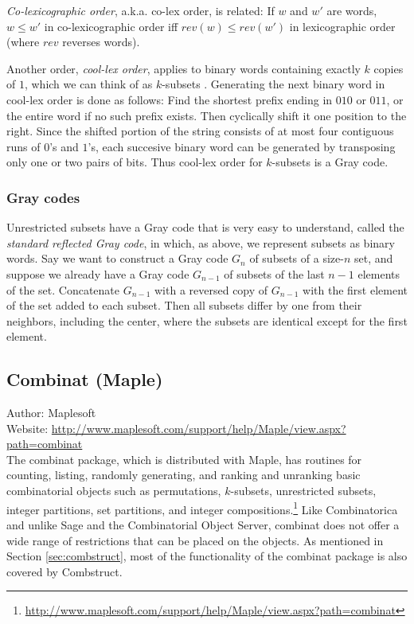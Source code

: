 \documentclass[12pt]{article}
\theoremstyle{plain}
\begin{document}
\emph{Co-lexicographic order}, a.k.a. co-lex order, is related: If \(w\) and \(w'\) are words, \(w \leq w'\) in co-lexicographic order iff \(rev(w) \leq rev(w')\) in lexicographic order (where \(rev\) reverses words).

Another order, \emph{cool-lex order}, applies to binary words containing exactly \( k \) copies of \(1\), which we can think of as \(k\)-subsets \cite{coollex}.
Generating the next binary word in cool-lex order is done as follows: Find the shortest prefix ending in \(010\) or \(011\), or the entire word if no such prefix exists.
Then cyclically shift it one position to the right.
Since the shifted portion of the string consists of at most four contiguous runs of \(0\)'s and \(1\)'s, each succesive binary word can be generated by transposing only one or two pairs of bits.
Thus cool-lex order for \(k\)-subsets is a Gray code.

\subsubsection{Gray codes}
Unrestricted subsets have a Gray code that is very easy to understand, called the \emph{standard reflected Gray code},
in which, as above, we represent subsets as binary words.
Say we want to construct a Gray code \(G_n\) of subsets of a size-\(n\) set,
and suppose we already have a Gray code \(G_{n-1}\) of subsets of the last \(n-1\) elements of the set.
Concatenate \(G_{n-1}\) with a reversed copy of \(G_{n-1}\) with the first element of the set added to each subset.
Then all subsets differ by one from their neighbors, including the center, where the subsets are identical except for the first element.


\subsection{Combinat (Maple)}
Author: Maplesoft
\\
Website: \url{http://www.maplesoft.com/support/help/Maple/view.aspx?path=combinat}
\\

The combinat package, which is distributed with Maple, has routines for counting, listing, randomly generating, and ranking and unranking basic combinatorial objects such as permutations, \(k\)-subsets,
unrestricted subsets, integer partitions, set partitions, and integer compositions.\footnote{
 \url{http://www.maplesoft.com/support/help/Maple/view.aspx?path=combinat}
}
Like Combinatorica and unlike Sage and the Combinatorial Object Server, combinat does not offer a wide range of restrictions that can be placed on the objects.
As mentioned in Section \ref{sec:combstruct},
most of the functionality of the combinat package
is also covered by Combstruct.
\end{document}
